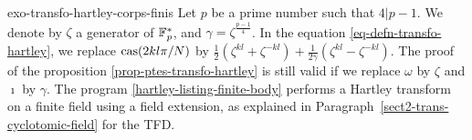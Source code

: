  
\begin{correction}{exo-transfo-hartley-corps-finis}
Let $ p $ be a prime number such that $ 4 | p-1 $. We denote by $ \zeta $ a generator of $ \mathbb{F}_p^* $, and $ \gamma = \zeta^{\frac{p-1}{4}} $. In the equation \eqref{eq-defn-transfo-hartley}, we replace $ \operatorname{cas} (2 kl \pi/N) $ by $ \frac{1}{2} (\zeta^{kl} + \zeta^{- kl}) + \frac{1}{2 \gamma} (\zeta^{kl} - \zeta^{- kl}) $. The proof of the proposition \ref{prop-ptes-transfo-hartley} is still valid if we replace $ \omega $ by $ \zeta $ and $ \imath $ by $ \gamma $. The program \Maple{} \ref{hartley-listing-finite-body} performs a Hartley transform on a finite field using a field extension, as explained in Paragraph~\ref{sect2-trans-cyclotomic-field} for the TFD.

\begin{listing} \begin{footnotesize}

\end{footnotesize}
\caption{Hartley transform on a cyclotomic field}
\label{hartley-listing-finite-body}
\end{listing}
\end{correction}
 
